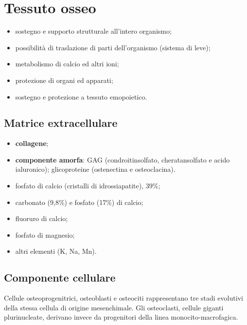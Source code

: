 \section{Tessuto osseo}

\begin{itemize}
  \item sostegno e supporto strutturale all'intero organismo;
  \item possibilità di traslazione di parti dell'organismo (sistema di leve);
  \item metabolismo di calcio ed altri ioni;
  \item protezione di organi ed apparati;
  \item sostegno e protezione a tessuto emopoietico.
\end{itemize}

\subsection{Matrice extracellulare}

\begin{itemize}
  \item \textbf{collagene};
  \item \textbf{componente amorfa}: GAG (condroitinsolfato, cheratansolfato e acido ialuronico); glicoproteine (ostenectina e osteoclacina).
\end{itemize}

\begin{itemize}
  \item fosfato di calcio (cristalli di idrossiapatite), 39\%;
  \item carbonato (9,8\%) e fosfato (17\%) di calcio;
  \item fluoruro di calcio;
  \item fosfato di magnesio;
  \item altri elementi (K, Na, Mn).
\end{itemize}

\subsection{Componente cellulare}

Cellule osteoprogenitrici, osteoblasti e osteociti rappresentano tre stadi evolutivi della stessa cellula di origine mesenchimale. Gli osteoclasti, cellule giganti plurinucleate, derivano invece da progenitori della linea monocito-macrofagica.

